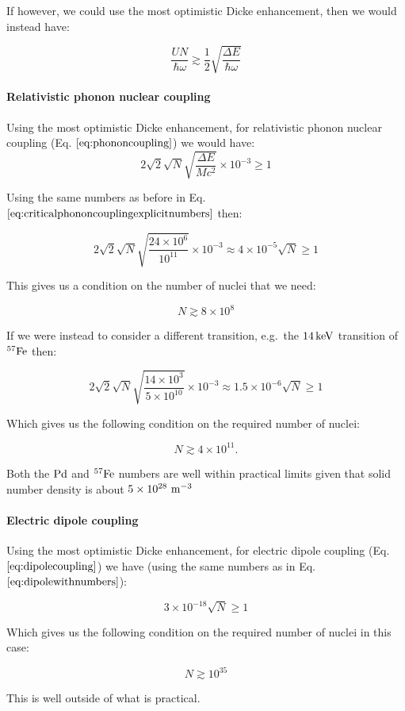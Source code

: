 \documentclass[
]{article}
\renewcommand{\[}{\begin{equation}}
\renewcommand{\]}{\end{equation}}
\begin{document}
If however, we could use the most optimistic Dicke enhancement, then we
would instead have:

\[
\frac{UN}{\hbar\omega} \gtrsim \frac{1}{2}\sqrt{\frac{\Delta E}{\hbar\omega}}
\label{eq:dickesuperradianttransition2}
\]

\paragraph{Relativistic phonon nuclear
coupling}\label{relativistic-phonon-nuclear-coupling-1}

Using the most optimistic Dicke enhancement, for relativistic phonon
nuclear coupling (Eq. \(\ref{eq:phononcoupling}\)) we would have: \[
2\sqrt{2}\sqrt{N} \sqrt{\frac{\Delta E}{M c^2}}  \times 10^{-3} \ge 1
\]

Using the same numbers as before in Eq.
\(\ref{eq:criticalphononcouplingexplicitnumbers}\) then:

\[
2\sqrt{2} \sqrt{N}\sqrt{\frac{24\times10^6}{10^{11}}}  \times 10^{-3} \approx 4 \times 10^{-5} \sqrt{N} \ge 1
\]

This gives us a condition on the number of nuclei that we need:

\[
N \gtrsim 8 \times 10^8
\]

If we were instead to consider a different transition, e.g.~the
\(\rm 14 \, keV\) transition of \(\rm ^{57}Fe\) then:

\[
2\sqrt{2} \sqrt{N}\sqrt{\frac{14\times10^3}{5\times 10^{10}}}  \times 10^{-3} \approx 1.5 \times 10^{-6} \sqrt{N} \ge 1
\]

Which gives us the following condition on the required number of nuclei:

\[
N \gtrsim 4 \times 10^{11}.
\]

Both the \(\rm Pd\) and \(\rm ^{57}Fe\) numbers are well within
practical limits given that solid number density is about
\(5\times 10^{28} \ \rm m^{-3}\)

\paragraph{Electric dipole coupling}\label{electric-dipole-coupling-1}

Using the most optimistic Dicke enhancement, for electric dipole
coupling (Eq. \(\ref{eq:dipolecoupling}\)) we have (using the same
numbers as in Eq. \(\ref{eq:dipolewithnumbers}\)):

\[
3\times 10^{-18}\sqrt{N}  \ge 1
\]

Which gives us the following condition on the required number of nuclei
in this case:

\[
N \gtrsim 10^{35}
\]

This is well outside of what is practical.

\printbibliography
\end{document}
